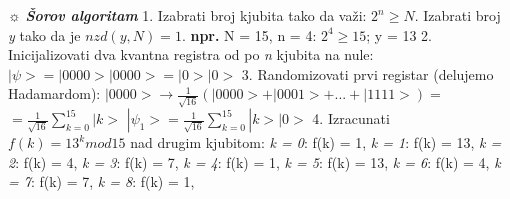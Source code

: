 \documentclass{article}
\begin{document}
\begin{tcolorbox}[width=\textwidth,colback={beaublue},outer arc=0mm,colupper=charcoal]    
$\sun$ \textit{\textbf{Šorov algoritam}}
\vspace{0.3cm}\newline\hspace*{0.4cm}
1. Izabrati broj kjubita tako da važi: $2^n \geq N$. \newline\hspace*{0.8cm}
Izabrati broj \textit{y} tako da je $nzd(y, N) = 1$.
\newline\hspace*{0.8cm}
\textbf{npr.} N = 15, n = 4: $2^4 \geq 15$; y = 13
\vspace{0.2cm}\newline\hspace*{0.4cm}
2. Inicijalizovati dva kvantna registra od po \textit{n} kjubita na nule:
\newline\hspace*{0.8cm}
$|\psi> = |0000>|0000> = |0>|0>$
\vspace{0.2cm}\newline\hspace*{0.4cm}
3. Randomizovati prvi registar (delujemo Hadamardom):
\newline\hspace*{0.8cm}
$|0000>\longrightarrow \frac{1}{\sqrt{16}}(|0000>+ |0001>+ ... + |1111>) = $
\newline\hspace*{0.8cm}
$ = \frac{1}{\sqrt{16}}\sum_{k=0}^{15}|k>$
\newline\hspace*{0.8cm}
$|\psi_1> = \frac{1}{\sqrt{16}}\sum_{k=0}^{15}|k>|0>$
\vspace{0.2cm}\newline\hspace*{0.4cm}
4. Izracunati $f(k) = 13^k mod 15$ nad drugim kjubitom:
\newline\hspace*{0.8cm}
\textit{k = 0}: f(k) = 1, \textit{k = 1}: f(k) = 13, \textit{k = 2}: f(k) = 4, \newline\hspace*{0.8cm}
\textit{k = 3}: f(k) = 7, \textit{k = 4}: f(k) = 1, \textit{k = 5}: f(k) = 13, \newline\hspace*{0.8cm}
\textit{k = 6}: f(k) = 4, \textit{k = 7}: f(k) = 7, \textit{k = 8}: f(k) = 1, \newline\hspace*{0.8cm}

\end{tcolorbox}
\end{document}
